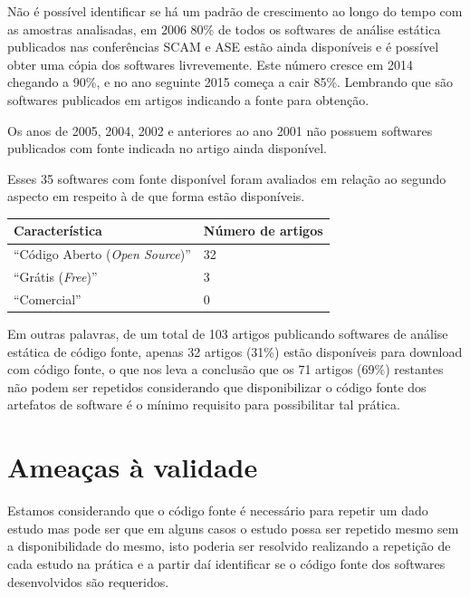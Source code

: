 Não é possível identificar se há um padrão de crescimento ao longo do tempo com
as amostras analisadas, em 2006 80\% de todos os softwares de análise estática
publicados nas conferências SCAM e ASE estão ainda disponíveis e é possível
obter uma cópia dos softwares livrevemente. Este número cresce em 2014 chegando
a 90\%, e no ano seguinte 2015 começa a cair 85\%. Lembrando que são softwares
publicados em artigos indicando a fonte para obtenção.

Os anos de 2005, 2004, 2002 e anteriores ao ano 2001 não possuem softwares
publicados com fonte indicada no artigo ainda disponível.

Esses 35 softwares com fonte disponível foram avaliados em relação ao segundo
aspecto em respeito à de que forma estão disponíveis.

\begin{table}[H]
\centering
\begin{tabular}{| l | l |}
  \hline
  {\bf Característica}                          & {\bf Número de artigos} \\
  \hline
  ``Código Aberto ({\it Open Source})''         & 32 \\
  \hline
  ``Grátis ({\it Free})''                       & 3  \\
  \hline
  ``Comercial''                                 & 0  \\
  \hline
\end{tabular}
\end{table}

Em outras palavras, de um total de 103 artigos publicando softwares de análise estática de
código fonte, apenas 32 artigos (31\%) estão disponíveis para download com
código fonte, o que nos leva a conclusão que os 71 artigos (69\%) restantes não
podem ser repetidos considerando que disponibilizar o código fonte dos
artefatos de software é o mínimo requisito para possibilitar tal prática.

\section{Ameaças à validade}

Estamos considerando que o código fonte é necessário para repetir um dado
estudo mas pode ser que em alguns casos o estudo possa ser repetido mesmo sem a
disponibilidade do mesmo, isto poderia ser resolvido realizando a repetição
de cada estudo na prática e a partir daí identificar se o código fonte dos
softwares desenvolvidos são requeridos.

